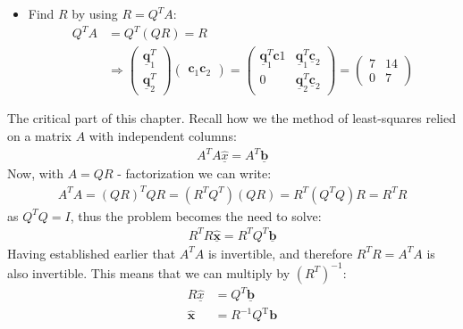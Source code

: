 \documentclass[10pt,a4paper]{article}
\begin{document}
\begin{itemize}
    \item Find $R$ by using $R = Q^TA$:
    \begin{align*}
        Q^{T} A&=Q^{T}(Q R)=R \\ &\Longrightarrow\left(\begin{array}{c}
            \underline{\mathbf{q}}_{1}^{T} \\
            \underline{\mathbf{q}}_{2}^{T}
            \end{array}\right)\left(\begin{array}{cc}
            \mathbf{c}_{1} \mathbf{c}_{2}
            \end{array}\right)=\left(\begin{array}{cc}
            \underline{\mathbf{q}}_{1}^{T} \mathbf{c} 1 & \underline{\mathbf{q}}_{1}^{T} \underline{\mathbf{c}}_{2} \\
            0 & \underline{\mathbf{q}}_{2}^{T} \underline{\mathbf{c}}_{2}
            \end{array}\right)=\left(\begin{array}{cc}
            7 & 14 \\
            0 & 7
            \end{array}\right)
    \end{align*}
\end{itemize}

\pagebreak

The critical part of this chapter. Recall how we the method of least-squares relied on a matrix $A$
with independent columns:
\begin{align*}
    A^{T} A \underline{\hat{x}}=A^{T} \underline{\mathbf{b}}
\end{align*}
Now, with $A = QR$ - factorization we can write:
\begin{align*}
    A^{T} A=(Q R)^{T} Q R=\left(R^{T} Q^{T}\right)(Q R)=R^{T}\left(Q^{T} Q\right) R=R^{T} R
\end{align*}
as $Q^T Q = I$, thus the problem becomes the need to solve:
\begin{align*}
    R^{T} R \underline{\hat{\mathbf{x}}}=R^{T} Q^{T} \underline{\mathbf{b}}
\end{align*}
Having established earlier that $A^T A$ is invertible, and therefore $R^T R = A^T A$ is also
invertible. This means that we can multiply by $(R^{T})^{-1}$:
\begin{align*}
    R \underline{\hat{x}}&=Q^{T} \underline{\mathbf{b}} \\
    \widehat{\boldsymbol{x}}&=R^{-1} Q^{\mathrm{T}} \boldsymbol{b}
\end{align*}
\end{document}
